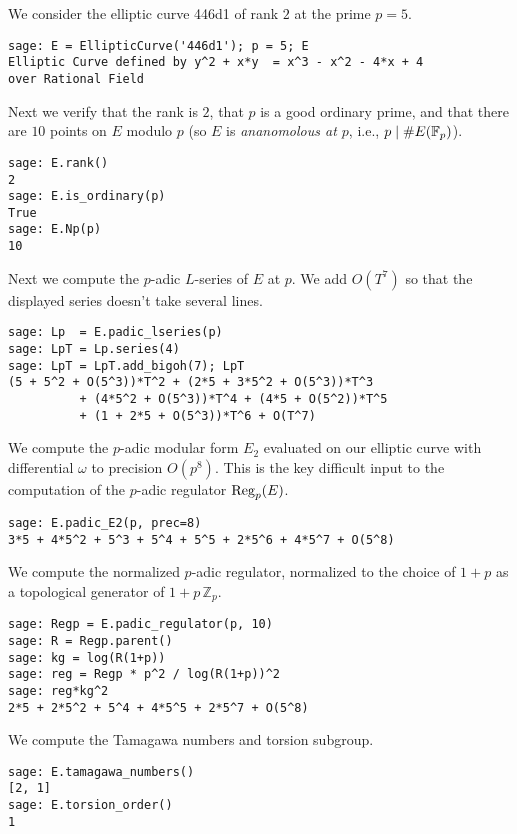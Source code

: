 We consider the elliptic curve 446d1 of rank $2$ at the prime
$p=5$. 
\begin{verbatim}
sage: E = EllipticCurve('446d1'); p = 5; E
Elliptic Curve defined by y^2 + x*y  = x^3 - x^2 - 4*x + 4 
over Rational Field
\end{verbatim}%

\noindent{}Next we verify that the rank is $2$, that $p$
is a good ordinary prime, and that there are $10$ points
on $E$ modulo $p$ (so $E$ is {\em ananomolous at $p$}, i.e.,
$p\mid \#E(\mathbb{F}_p)$).
\begin{verbatim}
sage: E.rank()
2
sage: E.is_ordinary(p)
True
sage: E.Np(p)
10
\end{verbatim}%

\noindent{}Next we compute the $p$-adic $L$-series of $E$ at $p$.
We add $O(T^7)$ so that the displayed series doesn't take several lines.
\begin{verbatim}
sage: Lp  = E.padic_lseries(p)
sage: LpT = Lp.series(4)
sage: LpT = LpT.add_bigoh(7); LpT
(5 + 5^2 + O(5^3))*T^2 + (2*5 + 3*5^2 + O(5^3))*T^3 
          + (4*5^2 + O(5^3))*T^4 + (4*5 + O(5^2))*T^5 
          + (1 + 2*5 + O(5^3))*T^6 + O(T^7)
\end{verbatim}%

\noindent{}We compute the $p$-adic modular form $E_2$ evaluated
on our elliptic curve with differential $\omega$ to precision $O(p^{8})$.
This is the key difficult input to the computation of the $p$-adic
regulator $\operatorname{Reg}_p(E)$.
\begin{verbatim}
sage: E.padic_E2(p, prec=8)
3*5 + 4*5^2 + 5^3 + 5^4 + 5^5 + 2*5^6 + 4*5^7 + O(5^8)
\end{verbatim}%

\noindent{}We compute the normalized $p$-adic regulator,
normalized to the choice of $1+p$ as a topological
generator of $1+p\,\mathbb{Z}_p$.
\begin{verbatim}
sage: Regp = E.padic_regulator(p, 10)
sage: R = Regp.parent()
sage: kg = log(R(1+p))
sage: reg = Regp * p^2 / log(R(1+p))^2
sage: reg*kg^2
2*5 + 2*5^2 + 5^4 + 4*5^5 + 2*5^7 + O(5^8)
\end{verbatim}%

\noindent{}We compute the Tamagawa numbers and torsion subgroup.
\begin{verbatim}
sage: E.tamagawa_numbers()
[2, 1]
sage: E.torsion_order()
1
\end{verbatim}%

